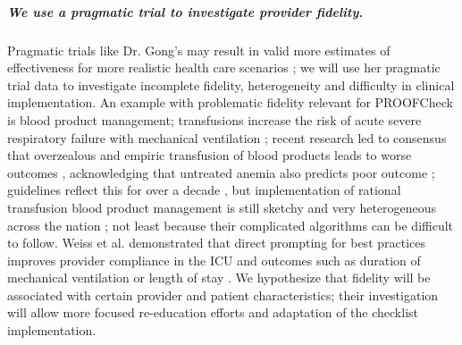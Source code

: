 \documentclass[11pt,notitlepage]{article}
\begin{document}
\subparagraph*{We use a pragmatic trial to investigate provider fidelity.} Pragmatic trials like Dr. Gong's may result in valid more estimates of effectiveness for more realistic health care scenarios \cite{Selby_22824225,Tosh_21842618}; we will use her pragmatic trial data to investigate incomplete fidelity, heterogeneity and difficulty in clinical implementation. An example with problematic fidelity relevant for PROOFCheck is blood product management; transfusions increase the risk of acute severe respiratory failure with mechanical ventilation \cite{Kenz_24892308};  recent research led to consensus that overzealous and empiric transfusion of blood products leads to worse outcomes \cite{Hebert_9971864}, acknowledging that untreated anemia also predicts poor outcome \cite{Ranucci_22698773}; guidelines reflect this for over a decade \cite{ASA_25545654}, but implementation of rational transfusion blood product management is still sketchy and very heterogeneous across the nation \cite{Likosky_20488928}; not least because their complicated algorithms can be difficult to follow. Weiss et al. demonstrated that direct prompting for best practices improves provider compliance in the ICU and outcomes such as duration of mechanical ventilation or length of stay \cite{Weiss_21616996}. We hypothesize that fidelity will be associated with certain provider and patient characteristics; their investigation will allow more focused re-education efforts and adaptation of the checklist implementation. 
\end{document}
